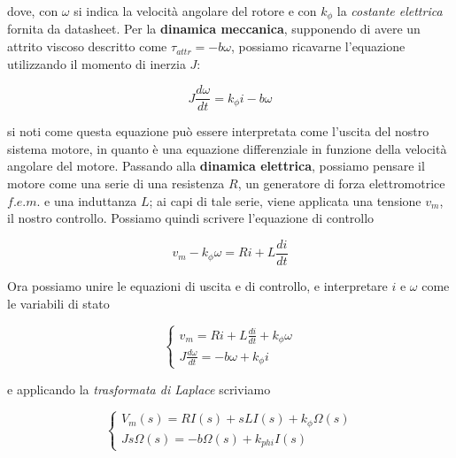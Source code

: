 \documentclass[english]{article}
\begin{document}
		\noindent dove, con $\omega$ si indica la velocità angolare del rotore e con $k_{\phi}$ la \textit{costante elettrica} fornita da datasheet.\newline
		Per la \textbf{dinamica meccanica}, supponendo di avere un attrito viscoso descritto come $\tau_{attr} = -b\omega$, possiamo ricavarne l'equazione utilizzando il momento di inerzia $J$:
	
		\begin{equation}
			J\frac{d\omega}{dt} = k_{\phi}i - b\omega
			\label{eq:uscita}
		\end{equation}  
	
		\noindent si noti come questa equazione può essere interpretata come l'uscita del nostro sistema motore, in quanto è una equazione differenziale in funzione della velocità angolare del motore. \newline
		Passando alla \textbf{dinamica elettrica}, possiamo pensare il motore come una serie di una resistenza $R$, un generatore di forza elettromotrice $f.e.m.$ e una induttanza $L$; ai capi di tale serie, viene applicata una tensione $v_m$, il nostro controllo. Possiamo quindi scrivere l'equazione di controllo
	
		\begin{equation}
			v_m -k_{\phi}\omega = Ri + L \frac{di}{dt}
			\label{eq:controllo}
		\end{equation}    
	
		\noindent Ora possiamo unire le equazioni di uscita e di controllo, e interpretare $i$ e $\omega$ come le variabili di stato
	
		\begin{equation}
			\begin{cases}
				v_m = Ri + L\frac{di}{dt} + k_{\phi}\omega \\
				J\frac{d\omega}{dt} = -b\omega + k_{\phi}i
			\end{cases}
			\label{eq:dinamicaComplessiva}
		\end{equation}
	
		\noindent e applicando la \textit{trasformata di Laplace} scriviamo
	
		\begin{equation}
			\begin{cases}
				V_m(s) = RI(s) +sLI(s) + k_{\phi}\Omega(s)\\
				Js\Omega(s) = -b\Omega(s) + k_{phi}I(s)	
			\end{cases}
			\label{eq:dinamecaComplessivaLaplace}
		\end{equation}
	
\end{document}
